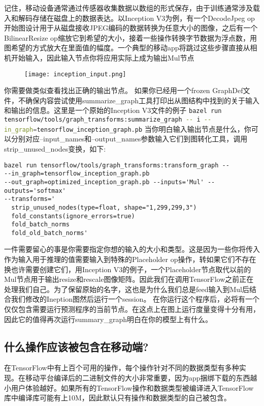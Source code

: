 记住，移动设备通常通过传感器收集数据以数组的形式保存，由于训练通常涉及载入和解码存储在磁盘上的数据表达。以Inception V3为例，有一个DecodeJpeg op开始图设计用于从磁盘接收JPEG编码的数据转换为任意大小的图像，之后有一个BilinearResize op缩放它到希望的大小，接着一些操作转换字节数据为浮点数，用图希望的方式放大在里面值的幅度。一个典型的移动app将跳过这些步骤直接从相机开始输入，因此输入节点你将应用实际上成为输出Mul节点
\begin{figure}[!h]
	\centering
	\texttt{[image: inception\_input.png]}
\end{figure}
你需要做类似查看找出正确的输出节点。
如果你已经用一个frozen GraphDef文件，不确保内容尝试使用summarize\_graph工具打印出从图结构中找到的关于输入和输出的信息。这里是一个原始的Inception V3文件的例子
\lstinline[language=Bash]{bazel run tensorflow/tools/graph_transforms:summarize_graph -- i --in_graph=tensorflow_inception_graph.pb}
当你明白输入输出节点是什么，你可以分别对应--input\_names和--output\_names参数输入它们到图转化工具，调用strip\_unused\_nodes变换，如下:
\begin{lstlisting}
bazel run tensorflow/tools/graph_transforms:transform_graph --
--in_graph=tensorflow_inception_graph.pb
--out_graph=optimized_inception_graph.pb --inputs='Mul' --outputs='softmax'
--transforms='
  strip_unused_nodes(type=float, shape="1,299,299,3")
  fold_constants(ignore_errors=true)
  fold_batch_norms
  fold_old_batch_norms'

\end{lstlisting}
一件需要留心的事是你需要指定你想的输入的大小和类型。这是因为一些你将传入作为输入用于推理的值需要输入到特殊的Placeholder op操作，转如果它们不存在换也许需要创建它们，用Inception V3的例子，一个Placeholder节点取代以前的Mul节点用于输出resize和rescale图像矩阵。因此我们在调用TensorFlow之前正在处理我们自己。为了保留原始的名字，这也是为什么我们总是feed输入到Mul后结合我们修改的Ineption图然后运行一个session。
在你运行这个程序后，必将有一个仅仅包含需要运行预测程序的当前节点。在这点上在图上运行度量变得十分有用，因此它的值得再次运行summary\_graph明白在你的模型上有什么。
\subsection{什么操作应该被包含在移动端?}
在TensorFlow中有上百个可用的操作，每个操作针对不同的数据类型有多种实现。在移动平台编译后的二进制文件的大小非常重要，因为app捆绑下载的东西越小用户体验越好。如果所有的TensorFlow操作和数据类型被编译进入TensorFlow库中编译库可能有上10M，因此默认只有操作和数据类型的自己被包含。

